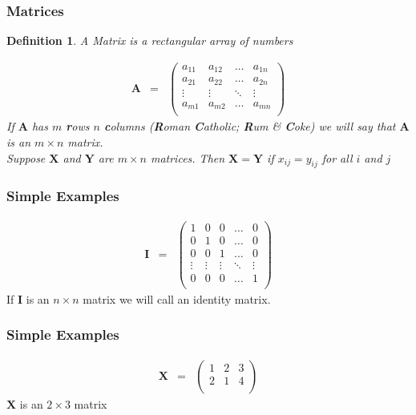 \documentclass[handout]{beamer}
\newtheorem{defn}{Definition}
\numberwithin{equation}{section}
\begin{document}
\begin{frame}
\frametitle{Matrices}

\begin{defn}
A Matrix is a rectangular array of numbers


\begin{eqnarray}
\boldsymbol{A} & = &  
\begin{pmatrix}
a_{11} & a_{12} & \hdots & a_{1n} \\
a_{21} & a_{22} & \hdots & a_{2n} \\
\vdots & \vdots & \ddots & \vdots \\
a_{m1} & a_{m2} & \hdots & a_{mn} \\
\end{pmatrix} 
\nonumber 
\end{eqnarray}
If $\boldsymbol{A}$ has $m$ \textbf{r}ows $n$ \textbf{c}olumns (\textbf{R}oman \textbf{C}atholic; \textbf{R}um \& \textbf{C}oke) we will say that $\boldsymbol{A}$ is an $m \times n$ matrix.  \\
Suppose $\boldsymbol{X}$ and $\boldsymbol{Y}$ are $m \times n$ matrices.  Then $\boldsymbol{X} = \boldsymbol{Y}$ if 
$x_{ij} = y_{ij}$ for all $i$ and $j$ 

\end{defn}
\end{frame}



\begin{frame}
\frametitle{Simple Examples} 

\begin{eqnarray} 
\boldsymbol{I} & = & \begin{pmatrix} 
1 & 0 & 0 & \hdots & 0 \\
0 & 1 & 0 & \hdots & 0 \\
0 & 0 & 1 & \hdots & 0 \\
\vdots & \vdots & \vdots & \ddots & \vdots \\
0 & 0 & 0 & \hdots & 1 \\
\end{pmatrix} 
\nonumber 
\end{eqnarray}
If $\boldsymbol{I}$ is an $n \times n$ matrix we will call an identity matrix.  

\end{frame}



\begin{frame}
\frametitle{Simple Examples} 

\begin{eqnarray}
\boldsymbol{X} & = & \begin{pmatrix} 
1 & 2 & 3 \\
2 & 1 & 4 \\
\end{pmatrix} 
\nonumber 
\end{eqnarray}
$\boldsymbol{X}$ is an $2 \times 3$ matrix

\end{frame}
\end{document}
